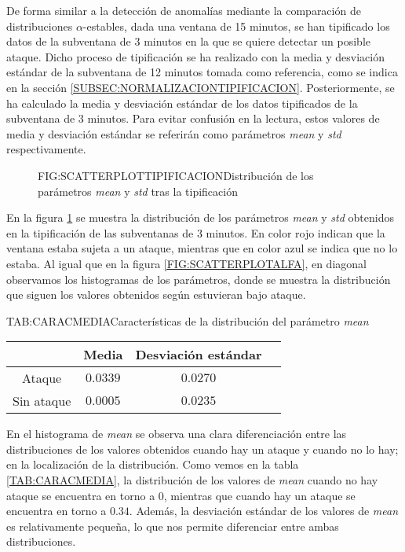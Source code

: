 De forma similar a la detección de anomalías mediante la comparación de distribuciones $\alpha$-estables, dada una ventana de 15 minutos, se han tipificado los datos de la subventana de 3 minutos en la que se quiere detectar un posible ataque. Dicho proceso de tipificación se ha realizado con la media y desviación estándar de la subventana de 12 minutos tomada como referencia, como se indica en la sección \ref{SUBSEC:NORMALIZACIONTIPIFICACION}. Posteriormente, se ha calculado la media y desviación estándar de los datos tipificados de la subventana de 3 minutos. Para evitar confusión en la lectura, estos valores de media y desviación estándar se referirán como parámetros \textit{mean} y \textit{std} respectivamente.

\begin{figure}[Distribución de los parámetros \textit{mean} y \textit{std} tras la tipificación]{FIG:SCATTERPLOTTIPIFICACION}{Distribución de los parámetros \textit{mean} y \textit{std} tras la tipificación}
    \label{FIG:SCATTERPLOTTIPIFICACION}
\end{figure}

En la figura \ref{FIG:SCATTERPLOTTIPIFICACION} se muestra la distribución de los parámetros \textit{mean} y \textit{std} obtenidos en la tipificación de las subventanas de 3 minutos. En color rojo indican que la ventana estaba sujeta a un ataque, mientras que en color azul se indica que no lo estaba. 
Al igual que en la figura \ref{FIG:SCATTERPLOTALFA}, en diagonal observamos los histogramas de los parámetros, donde se muestra la distribución que siguen los valores obtenidos según estuvieran bajo ataque.

\begin{table}[Características de la distribución del parámetro \textit{mean}]{TAB:CARACMEDIA}{Características de la distribución del parámetro \textit{mean}}
    \begin{tabular}{|c|c|c|c|}
        \hline
        & Media & Desviación estándar \\
        \hline
        Ataque & $0.0339$ & $0.0270$ \\
        Sin ataque & $0.0005$ & $0.0235$ \\
        \hline
    \end{tabular}
\end{table}

En el histograma de \textit{mean} se observa una clara diferenciación entre las distribuciones de los valores obtenidos cuando hay un ataque y cuando no lo hay; en la localización de la distribución.
Como vemos en la tabla \ref{TAB:CARACMEDIA}, la distribución de los valores de \textit{mean} cuando no hay ataque se encuentra en torno a $0$, mientras que cuando hay un ataque se encuentra en torno a $0.34$. Además, la desviación estándar de los valores de \textit{mean} es relativamente pequeña, lo que nos permite diferenciar entre ambas distribuciones.

